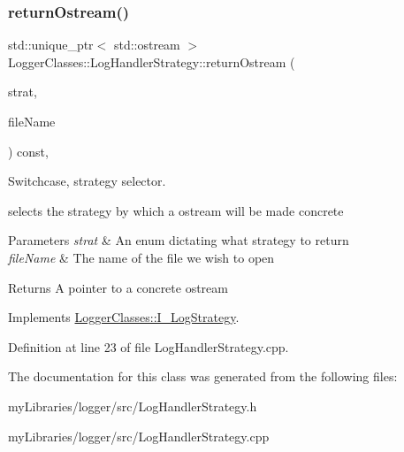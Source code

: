 \subsubsection{\texorpdfstring{returnOstream()}{returnOstream()}}
{\footnotesize\ttfamily std\+::unique\+\_\+ptr$<$ std\+::ostream $>$ Logger\+Classes\+::\+Log\+Handler\+Strategy\+::return\+Ostream (\begin{DoxyParamCaption}\item[{Strategy\+Enums}]{strat,  }\item[{const std\+::string \&}]{file\+Name }\end{DoxyParamCaption}) const\hspace{0.3cm}{\ttfamily [override]}, {\ttfamily [virtual]}}



Switchcase, strategy selector. 

selects the strategy by which a ostream will be made concrete


\begin{DoxyParams}{Parameters}
{\em strat} & An enum dictating what strategy to return \\
\hline
{\em file\+Name} & The name of the file we wish to open \\
\hline
\end{DoxyParams}
\begin{DoxyReturn}{Returns}
A pointer to a concrete ostream 
\end{DoxyReturn}


Implements \mbox{\hyperlink{classLoggerClasses_1_1I__LogStrategy_a1c2601ad4bd896794fa7de7fb1dbbbd8}{Logger\+Classes\+::\+I\+\_\+\+Log\+Strategy}}.



Definition at line 23 of file Log\+Handler\+Strategy.\+cpp.



The documentation for this class was generated from the following files\+:\begin{DoxyCompactItemize}
\item 
my\+Libraries/logger/src/Log\+Handler\+Strategy.\+h\item 
my\+Libraries/logger/src/Log\+Handler\+Strategy.\+cpp\end{DoxyCompactItemize}
